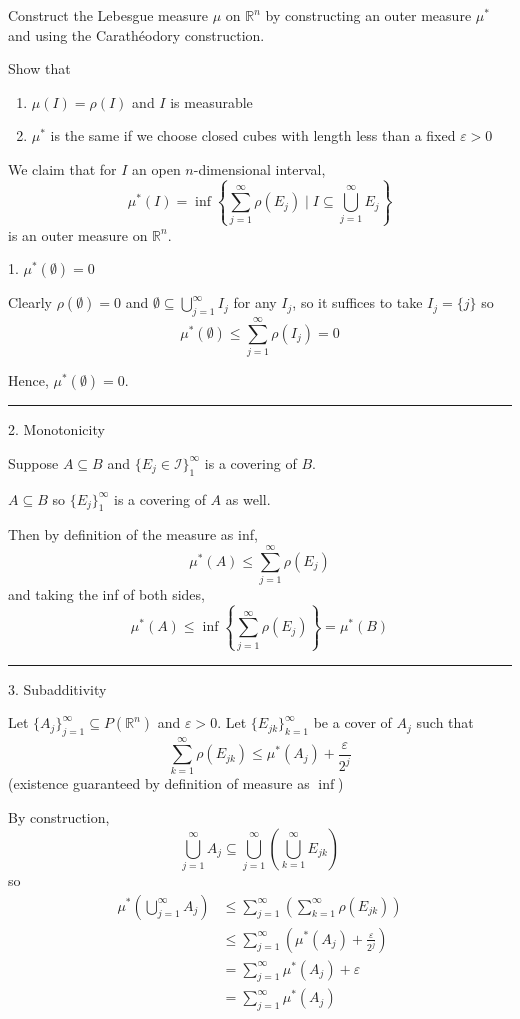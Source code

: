 \documentclass[12pt]{article}
\newcommand{\R}{\mathbb{R}}
\newcommand{\ep}{\varepsilon}
\newcommand{\sub}{\subseteq}
\renewcommand{\div}{\vspace*{10pt}\hrule\vspace*{10pt}}
\begin{document}
Construct the Lebesgue measure $\mu$ on $\R^n$ by constructing an outer measure $\mu^*$ and using the Carathéodory construction.

Show that 
\begin{enumerate}
    \item $\mu(I) = \rho(I)$ and $I$ is measurable 
    \item $\mu^*$ is the same if we choose closed cubes with length less than a fixed $\ep >0$
\end{enumerate}

\color{blue}
    We claim that for $I$ an open $n$-dimensional interval,
    \[\mu^*(I) = \inf\left\{\sum_{j=1}^{\infty} \rho(E_j) \;\bigg\vert\; I \sub \bigcup_{j=1}^\infty E_j \right\}\]
    is an outer measure on $\R^n$. 

    1. $\mu^*(\emptyset) = 0$

    Clearly $\rho(\emptyset) = 0$ and $\emptyset \sub \bigcup_{j=1}^\infty I_j$ for any $I_j$, so it suffices to take $I_j = \{j\}$ so 
    \[\mu^*(\emptyset) \leq \sum_{j=1}^\infty \rho(I_j) = 0\]
    
    Hence, $\mu^*(\emptyset) = 0$.

    \div 

    2. Monotonicity 

    Suppose $A \sub B$ and $\{E_j \in \mathcal I\}_{1}^{\infty}$ is a covering of $B$. 

    $A \sub B$ so $\{E_j\}_{1}^{\infty}$ is a covering of $A$ as well. 

    Then by definition of the measure as inf, 
    \[\mu^*(A) \leq \sum_{j=1}^{\infty} \rho(E_j)\]
    and taking the inf of both sides, 
    \[\mu^*(A) \leq \inf\left\{\sum_{j=1}^{\infty} \rho(E_j)\right\} = \mu^*(B)\]

    \div 

    3. Subadditivity 

    Let $\{A_j\}_{j=1}^{\infty} \sub P(\R^n)$ and $\ep > 0$. Let $\{E_{jk}\}_{k=1}^{\infty}$ be a cover of $A_j$ such that 
    \[\sum_{k=1}^{\infty} \rho(E_{jk}) \leq \mu^*(A_j) + \frac{\ep}{2^j}\]
    (existence guaranteed by definition of measure as $\inf$)

    By construction, 
    \[\bigcup_{j=1}^{\infty} A_j \sub \bigcup_{j=1}^{\infty} \left(\bigcup_{k=1}^\infty E_{jk}\right)\]
    so 
    \begin{align*}
        \mu^*\left(\bigcup_{j=1}^{\infty} A_j\right) &\leq \sum_{j=1}^{\infty} \left(\sum_{k=1}^{\infty} \rho(E_{jk})\right)\\ 
        &\leq \sum_{j=1}^{\infty}\left(\mu^*(A_j) + \frac{\ep}{2^j}\right) \\
        &= \sum_{j=1}^{\infty} \mu^*(A_j) + \ep\\ 
        &= \sum_{j=1}^{\infty} \mu^*(A_j)
    \end{align*} 
\end{document}
